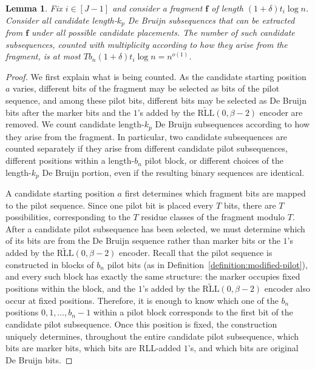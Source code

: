 \documentclass[journal,letterpaper,onecolumn,11pt]{IEEEtran}
\newcommand{\boldf}{\mathbf{f}}
\newtheorem{lemma}{Lemma}
\begin{document}
\begin{lemma}\label{lemma:number-of-debruijn-subsequences-in-fragment}
Fix $i\in[J-1]$ and consider a fragment $\boldf$ of length
$(1+\delta)t_i\log n$.
Consider all candidate length-$k_p$ De Bruijn subsequences that can be
extracted from $\boldf$ under all possible candidate placements.
The number of such candidate subsequences, counted with multiplicity
according to how they arise from the fragment, is at most
\(Tb_n(1+\delta)t_i\log n=n^{o(1)}\).
\end{lemma}

\begin{proof}
We first explain what is being counted.
As the candidate starting position \(a\) varies, different bits of the
fragment may be selected as bits of the pilot sequence, and among these
pilot bits, different bits may be selected as De Bruijn bits after the
marker bits and the \(1\)'s added by the
\(\widetilde{\mathrm{RLL}}(0,\beta-2)\) encoder are removed.
We count candidate length-\(k_p\) De Bruijn subsequences according to
how they arise from the fragment. In particular, two candidate
subsequences are counted separately if they arise from different
candidate pilot subsequences, different positions within a length-\(b_n\)
pilot block, or different choices of the length-\(k_p\) De Bruijn
portion, even if the resulting binary sequences are identical.

A candidate starting position \(a\) first determines which fragment bits
are mapped to the pilot sequence.
Since one pilot bit is placed every
\(T\) bits, there are \(T\) possibilities, corresponding
to the \(T\) residue classes of the fragment modulo \(T\).
After a candidate pilot subsequence has been selected, we must determine
which of its bits are from the De Bruijn sequence rather than marker bits
or the \(1\)'s added by the
\(\widetilde{\mathrm{RLL}}(0,\beta-2)\) encoder.
Recall that the pilot
sequence is constructed in blocks of \(b_n\) pilot bits
(as in Definition~\ref{definition:modified-pilot}), and every such
block has exactly the same structure: the marker occupies fixed positions
within the block, and the \(1\)'s added by the
\(\widetilde{\mathrm{RLL}}(0,\beta-2)\) encoder also occur at fixed
positions.
Therefore, it is enough to know which one of the
\(b_n\) positions \(0,1,\ldots,b_n-1\) within a pilot block corresponds
to the first bit of the candidate pilot subsequence.
Once this position is fixed, the construction uniquely determines,
throughout the entire candidate pilot subsequence, which bits are marker
bits, which bits are RLL-added \(1\)'s, and which bits are original
De Bruijn bits.


\end{proof}
\end{document}
